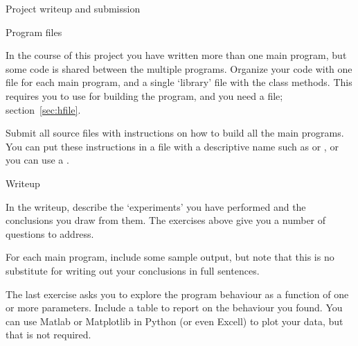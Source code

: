  {Project writeup and submission}

 {Program files}

In the course of this project you have written more than one main
program, but some code is shared between the multiple programs.
Organize your code with one file for each main program, and a single
`library' file with the class methods. This requires you to use
 for building the program, and you
need a  file; section~\ref{sec:hfile}.

Submit all source files with instructions on how to build all the main
programs. You can put these instructions in a file with a descriptive
name such as  or , or you can use a
.

 {Writeup}

In the writeup, describe the `experiments' you have performed and the
conclusions you draw from them. The exercises above give you a number
of questions to address.

For each main program, include some sample output, but note that this
is no substitute for writing out your conclusions in full sentences.

The last exercise asks you to explore the program behaviour as a
function of one or more parameters. Include a table to report on the
behaviour you found. You can use Matlab or Matplotlib in Python (or
even Excell) to plot your data, but that is not required.

\endinput

\begin{exercise}
  You can make the model more realistic by letting innoculation be
  only partly effective. For instance, 50\% of people got the flu
  vaccine, but it was only 40\% effective; 90\%~of people have the
  measles vaccine, and it is about 97\%
  effective. (\url{https://www.cdc.gov/nchs/fastats/immunize.htm}) How
  does your model function in this case? Keep in mind that different
  diseases have different degrees of infectuousness
  (\url{https://en.wikipedia.org/wiki/Basic_reproduction_number}).
\end{exercise}
